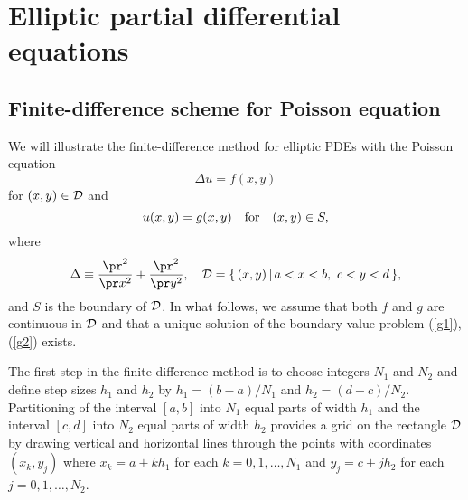 %
%
%


\section{Elliptic partial differential equations}

\subsection{Finite-difference scheme for Poisson equation}

We will illustrate the finite-difference
method for elliptic PDEs with the Poisson equation
\begin{equation}
\Delta u = f(x,y)   \label{g1}
\end{equation}
for $(x,y)\in{\cal D}$ and
\begin{equation}
u(x,y) = g(x,y) \quad \hbox{for} \quad (x,y)\in S,   \label{g2}
\end{equation}
where
\[
\Delta\equiv\frac{\pr^{2}}{\pr x^{2}}+ \frac{\pr^{2}}{\pr y^{2}}, \quad
{\cal D}=\{\, (x,y)\, \vert \,  a<x<b, \ c<y<d \, \},
\]
and $S$ is the boundary of ${\cal D}$. In what follows, we assume that both
$f$ and $g$ are continuous
in ${\cal D}$ and that a unique solution of
the boundary-value problem (\ref{g1}), (\ref{g2}) exists.


 
The first step in the finite-difference method is to choose integers $N_{1}$ and $N_{2}$ and define
step sizes $h_{1}$ and $h_{2}$ by $h_{1}=(b-a)/N_{1}$ and $h_{2}=(d-c)/N_{2}$. Partitioning of
the interval $[a, b]$ into $N_{1}$ equal parts of width $h_{1}$ and
the interval $[c, d]$ into $N_{2}$ equal parts of width $h_{2}$ provides a grid on the
rectangle ${\cal D}$ by drawing vertical and horizontal lines through the points with coordinates
$(x_{k}, y_{j})$ where $x_{k}=a+kh_{1}$ for each $k=0,1,\dots,N_{1}$ and
$y_{j}=c+jh_{2}$ for each $j=0,1,\dots,N_{2}$.
 
